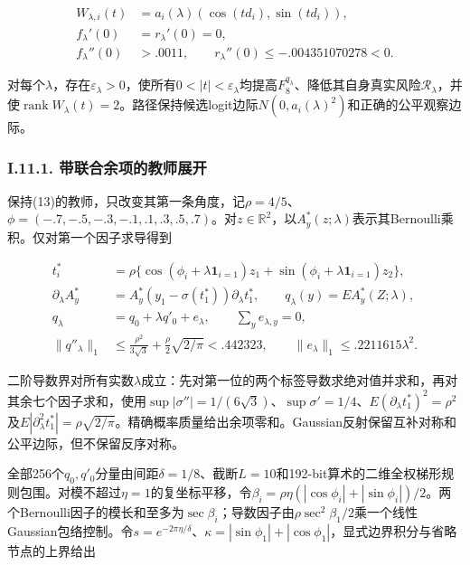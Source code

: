 \documentclass[11pt,a4paper]{article}
\begin{document}
\[
\begin{aligned}
W_{\lambda,i}(t)&=a_i(\lambda)(\cos(td_i),\sin(td_i)),\\
f_\lambda'(0)&=r_\lambda'(0)=0,\\
f_\lambda''(0)&>.0011,\qquad
r_\lambda''(0)\le-.004351070278<0.
\end{aligned}
\]

对每个\(\lambda\)，存在\(\varepsilon_\lambda>0\)，使所有\(0<|t|<\varepsilon_\lambda\)均提高\(F_8^{q_\lambda}\)、降低其自身真实风险\(\mathcal R_\lambda\)，并使\(\operatorname{rank}W_\lambda(t)=2\)。路径保持候选logit边际\(N(0,a_i(\lambda)^2)\)和正确的公平观察边际。

\subsubsection*{I.11.1.
带联合余项的教师展开}\label{i.11.1.-ux5e26ux8054ux5408ux4f59ux9879ux7684ux6559ux5e08ux5c55ux5f00}

保持(13)的教师，只改变其第一条角度，记\(\rho=4/5\)、\(\phi=(-.7,-.5,-.3,-.1,.1,.3,.5,.7)\)。对\(z\in\mathbb R^2\)，以\(A_y^*(z;\lambda)\)表示其Bernoulli乘积。仅对第一个因子求导得到

\[
\begin{aligned}
t_i^*&=\rho\{\cos(\phi_i+\lambda\mathbf1_{i=1})z_1
+\sin(\phi_i+\lambda\mathbf1_{i=1})z_2\},\\
\partial_\lambda A_y^*&=A_y^*(y_1-\sigma(t_1^*))\partial_\lambda t_1^*,
\qquad q_\lambda(y)=E A_y^*(Z;\lambda),\\
q_\lambda&=q_0+\lambda q'_0+e_\lambda,\qquad
\sum_y e_{\lambda,y}=0,\\
\|q''_\lambda\|_1&\le\frac{\rho^2}{3\sqrt3}
+\frac\rho2\sqrt{2/\pi}<.442323,\qquad
\|e_\lambda\|_1\le .2211615\lambda^2.
\end{aligned}
\tag{I.56}
\]

二阶导数界对所有实数\(\lambda\)成立：先对第一位的两个标签导数求绝对值并求和，再对其余七个因子求和，使用\(\sup|\sigma''|=1/(6\sqrt3)\)、\(\sup\sigma'=1/4\)、\(E(\partial_\lambda t_1^*)^2=\rho^2\)及\(E|\partial_\lambda^2t_1^*|=\rho\sqrt{2/\pi}\)。精确概率质量给出余项零和。Gaussian反射保留互补对称和公平边际，但不保留反序对称。

全部256个\(q_0,q'_0\)分量由间距\(\delta=1/8\)、截断\(L=10\)和192-bit算术的二维全权梯形规则包围。对模不超过\(\eta=1\)的复坐标平移，令\(\beta_i=\rho\eta(|\cos\phi_i|+|\sin\phi_i|)/2\)。两个Bernoulli因子的模长和至多为\(\sec\beta_i\)；导数因子由\(\rho\sec^2\beta_1/2\)乘一个线性Gaussian包络控制。令\(s=e^{-2\pi\eta/\delta}\)、\(\kappa=|\sin\phi_1|+|\cos\phi_1|\)，显式边界积分与省略节点的上界给出
\end{document}
